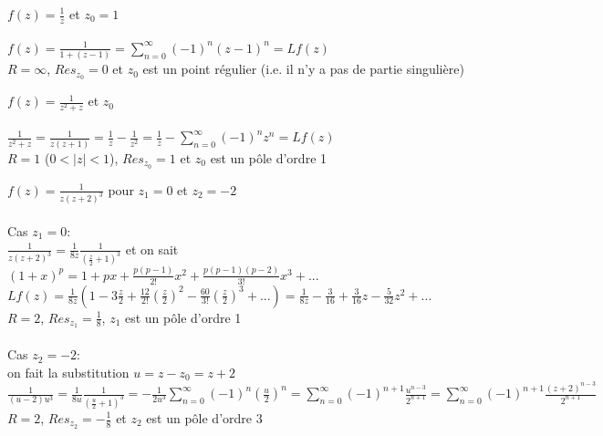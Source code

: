 \begin{myExample}
	$f(z)=\frac{1}{z}$ et $z_{0}=1$
	\\\\
	$f(z)=\frac{1}{1+(z-1)}=\sum_{n=0}^{\infty}(-1)^n(z-1)^n=Lf(z)$
	\\
	$R=\infty$, $Res_{z_{0}}=0$ et $z_{0}$ est un point régulier (i.e. il n'y a pas de partie singulière)
\end{myExample}

\begin{myExample}
	$f(z)=\frac{1}{z^2+z}$ et $z_{0}$
	\\\\
	$\frac{1}{z^2+z}=\frac{1}{z(z+1)}=\frac{1}{z}-\frac{1}{z^2}=\frac{1}{z} - \sum_{n=0}^{\infty}(-1)^nz^n=Lf(z)$
	\\
	$R=1$ ($0<|z|<1$), $Res_{z_{0}}=1$ et $z_{0}$ est un pôle d'ordre 1
\end{myExample}

\begin{myExample}
	$f(z)=\frac{1}{z(z+2)^3}$ pour $z_{1}=0$ et $z_{2}=-2$
	\\\\
	Cas $z_{1}=0$:
	\\
	$\frac{1}{z(z+2)^3}=\frac{1}{8z}\frac{1}{(\frac{z}{2}+1)^3}$ et on sait $(1+x)^p=1+px+\frac{p(p-1)}{2!}x^2+\frac{p(p-1)(p-2)}{3!}x^3+...$
	\\
	$Lf(z)=\frac{1}{8z}(1-3\frac{z}{2}+\frac{12}{2!}(\frac{z}{2})^2-\frac{60}{3!}(\frac{z}{2})^3+...)=\frac{1}{8z}-\frac{3}{16}+\frac{3}{16}z-\frac{5}{32}z^2+...$
	\\
	$R=2$, $Res_{z_{1}}=\frac{1}{8}$, $z_{1}$ est un pôle d'ordre 1
	\\
	\\
	Cas $z_{2}=-2$: 
	\\
	on fait la substitution $u=z-z_{0}=z+2$
	\\
	$\frac{1}{(u-2)u^3}=\frac{1}{8u}\frac{1}{(\frac{u}{2}+1)^3}=-\frac{1}{2u^3}\sum_{n=0}^{\infty}(-1)^n(\frac{u}{2})^n
	=\sum_{n=0}^{\infty}(-1)^{n+1}\frac{u^{n-3}}{2^{n+1}}=\sum_{n=0}^{\infty}(-1)^{n+1}\frac{(z+2)^{n-3}}{2^{n+1}}$
	\\
	$R=2$, $Res_{z_{2}}=-\frac{1}{8}$ et $z_{2}$ est un pôle d'ordre 3
	
\end{myExample}

